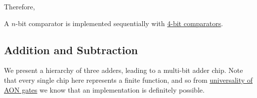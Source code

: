  Therefore, 

  \begin{definition}
    \label{def:n-bit-comparator}
    A $n$-bit comparator is implemented sequentially with \hyperref[def:4-bit-comparator]{4-bit comparators}. 
  \end{definition}

\subsection{Addition and Subtraction} 

  We present a hierarchy of three adders, leading to a multi-bit adder chip. Note that every single chip here represents a finite function, and so from  \hyperref[th-thm:aon_univ]{universality of AON gates} we know that an implementation is definitely possible. 
  
